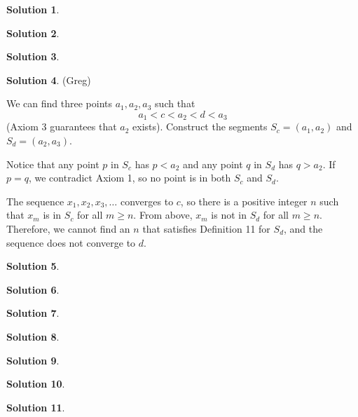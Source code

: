 \documentclass{article}
\theoremstyle{definition}
\newtheorem{solution}{Solution}
\begin{document}
\begin{solution} %
\end{solution}

\begin{solution} %
\end{solution}

\begin{solution} %
\end{solution}

\begin{solution} %
(Greg)

We can find three points $a_1, a_2, a_3$ such that
\begin{equation*}
	a_1 < c < a_2 < d < a_3
\end{equation*}
(Axiom 3 guarantees that $a_2$ exists).
Construct the segments $S_c = (a_1, a_2)$ and $S_d = (a_2, a_3)$.

Notice that any point $p$ in $S_c$ has $p < a_2$ and any point $q$ in $S_d$ has $q > a_2$.
If $p = q$, we contradict Axiom 1, so no point is in both $S_c$ and $S_d$.

The sequence $x_1, x_2, x_3, \dots$ converges to $c$, so there is a positive integer $n$ such that $x_m$ is in $S_c$ for all $m \geq n$.
From above, $x_m$ is not in $S_d$ for all $m \geq n$.
Therefore, we cannot find an $n$ that satisfies Definition 11 for $S_d$, and the sequence does not converge to $d$. 
\end{solution}

\begin{solution} %
\end{solution}

\begin{solution} %
\end{solution}

\begin{solution} %
\end{solution}

\begin{solution} %
\end{solution}

\begin{solution} %
\end{solution}

\begin{solution} %
\end{solution}

\begin{solution} %
\end{solution}
\end{document}
